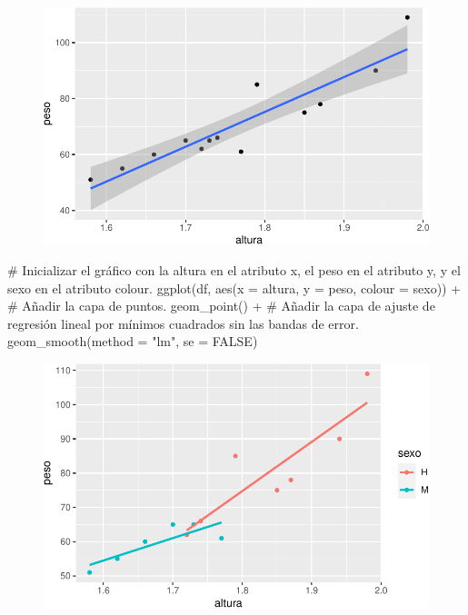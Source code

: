 \documentclass[
  a4paper,
]{scrreport}
\newenvironment{Shaded}{\begin{snugshade}}{\end{snugshade}}
\newcommand{\AttributeTok}[1]{\textcolor[rgb]{0.40,0.45,0.13}{#1}}
\newcommand{\CommentTok}[1]{\textcolor[rgb]{0.37,0.37,0.37}{#1}}
\newcommand{\ConstantTok}[1]{\textcolor[rgb]{0.56,0.35,0.01}{#1}}
\newcommand{\FunctionTok}[1]{\textcolor[rgb]{0.28,0.35,0.67}{#1}}
\newcommand{\NormalTok}[1]{\textcolor[rgb]{0.00,0.23,0.31}{#1}}
\newcommand{\SpecialCharTok}[1]{\textcolor[rgb]{0.37,0.37,0.37}{#1}}
\newcommand{\StringTok}[1]{\textcolor[rgb]{0.13,0.47,0.30}{#1}}
\theoremstyle{definition}
\theoremstyle{definition}
\theoremstyle{remark}
\begin{document}
\begin{figure}[H]

{\centering \includegraphics{07-graficos_files/figure-pdf/unnamed-chunk-25-1.pdf}

}

\end{figure}

\begin{Shaded}
\begin{Highlighting}[]
\CommentTok{\# Inicializar el gráfico con la altura en el atributo x, el peso en el atributo y, y el sexo en el atributo colour.}
\FunctionTok{ggplot}\NormalTok{(df, }\FunctionTok{aes}\NormalTok{(}\AttributeTok{x =}\NormalTok{ altura, }\AttributeTok{y =}\NormalTok{ peso, }\AttributeTok{colour =}\NormalTok{ sexo)) }\SpecialCharTok{+}
\CommentTok{\# Añadir la capa de puntos.}
    \FunctionTok{geom\_point}\NormalTok{() }\SpecialCharTok{+}
\CommentTok{\# Añadir la capa de ajuste de regresión lineal por mínimos cuadrados sin las bandas de error.}
    \FunctionTok{geom\_smooth}\NormalTok{(}\AttributeTok{method =} \StringTok{"lm"}\NormalTok{, }\AttributeTok{se =} \ConstantTok{FALSE}\NormalTok{)}
\end{Highlighting}
\end{Shaded}

\begin{figure}[H]

{\centering \includegraphics{07-graficos_files/figure-pdf/unnamed-chunk-26-1.pdf}

}

\end{figure}
\end{document}
